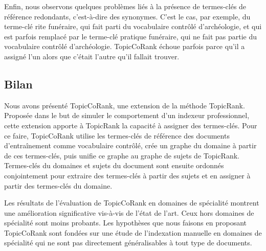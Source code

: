         Enfin, nous observons quelques problèmes liés à la présence de
        termes-clés de référence redondants, c'est-à-dire des synonymes. C'est
        le cas, par exemple, du terme-clé \og{}rite funéraire\fg{}, qui fait
        parti du vocabulaire contrôlé d'archéologie, et qui est parfois remplacé
        par le terme-clé \og{}pratique funéraire\fg{}, qui ne fait pas partie du
        vocabulaire contrôlé d'archéologie. TopicCoRank échoue parfois parce
        qu'il a assigné l'un alors que c'était l'autre qu'il fallait trouver.

    \subsection{Bilan}
    \label{subsec:main-domain_specific_keyphrase_annotation-supervised_automatic_keyphrase_annotation-conclusion}
      Nous avons présenté TopicCoRank, une extension de la méthode TopicRank.
      Proposée dans le but de simuler le comportement d'un indexeur
      professionnel, cette extension apporte à TopicRank la capacité à assigner
      des termes-clés. Pour ce faire, TopicCoRank utilise les termes-clés de
      référence des documents d'entraînement comme vocabulaire contrôlé, crée un
      graphe du domaine à partir de ces termes-clés, puis unifie ce
      graphe au graphe de sujets de TopicRank. Termes-clés du domaines et sujets
      du document sont ensuite ordonnés conjointement pour extraire des
      termes-clés à partir des sujets et en assigner à partir des termes-clés du
      domaine.

      Les résultats de l'évaluation de TopicCoRank en domaines de spécialité
      montrent une amélioration significative vis-à-vis de l'état de l'art. Ceux
      hors domaines de spécialité sont moins probants. Les hypothèses que nous
      faisons en proposant TopicCoRank sont fondées sur une étude de
      l'indexation manuelle en domaines de spécialité qui ne sont pas
      directement généralisables à tout type de documents.

